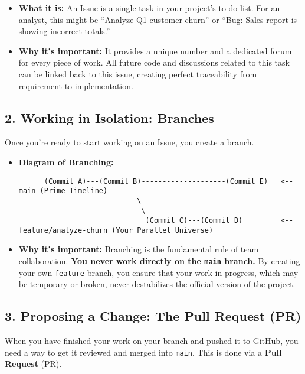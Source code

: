\documentclass[
  letterpaper,
  DIV=11,
  numbers=noendperiod]{scrreprt}
\providecommand{\tightlist}{%
  \setlength{\itemsep}{0pt}\setlength{\parskip}{0pt}}
\begin{document}
\begin{itemize}
\tightlist
\item
  \textbf{What it is:} An Issue is a single task in your project's to-do
  list. For an analyst, this might be ``Analyze Q1 customer churn'' or
  ``Bug: Sales report is showing incorrect totals.''
\item
  \textbf{Why it's important:} It provides a unique number and a
  dedicated forum for every piece of work. All future code and
  discussions related to this task can be linked back to this issue,
  creating perfect traceability from requirement to implementation.
\end{itemize}

\subsection{2. Working in Isolation:
Branches}\label{working-in-isolation-branches}

Once you're ready to start working on an Issue, you create a branch.

\begin{itemize}
\item
  \textbf{Diagram of Branching:}

\begin{verbatim}
      (Commit A)---(Commit B)--------------------(Commit E)   <-- main (Prime Timeline)
                            \
                             \
                              (Commit C)---(Commit D)         <-- feature/analyze-churn (Your Parallel Universe)
\end{verbatim}
\item
  \textbf{Why it's important:} Branching is the fundamental rule of team
  collaboration. \textbf{You never work directly on the \texttt{main}
  branch.} By creating your own \texttt{feature} branch, you ensure that
  your work-in-progress, which may be temporary or broken, never
  destabilizes the official version of the project.
\end{itemize}

\subsection{3. Proposing a Change: The Pull Request
(PR)}\label{proposing-a-change-the-pull-request-pr}

When you have finished your work on your branch and pushed it to GitHub,
you need a way to get it reviewed and merged into \texttt{main}. This is
done via a \textbf{Pull Request} (PR).
\end{document}
